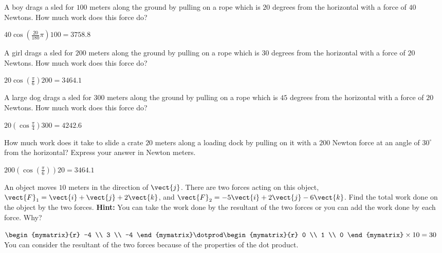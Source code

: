 \begin{enumialphparenastyle}

\begin{ex} A boy drags a sled for $100$ meters along the ground by pulling on a rope
which is $20$ degrees from the horizontal with a force of $40$ Newtons. How much
work does this force do?
\begin{sol}
$40\cos \left( \frac{20}{180}\pi \right)100=3758.8  $
\end{sol}
\end{ex}

\begin{ex} A girl drags a sled for $200$ meters along the ground by pulling on a rope
which is $30$ degrees from the horizontal with a force of $20$ Newtons. How much
work does this force do?
\begin{sol}
$20\cos \left( \frac{\pi }{6}\right)200= 3464.1 $
\end{sol}
\end{ex}

\begin{ex} A large dog drags a sled for $300$ meters along the ground by pulling on a
rope which is $45$ degrees from the horizontal with a force of $20$ Newtons. How
much work does this force do?
\begin{sol}
 $20\left( \cos \frac{\pi }{4}\right)300=4242.6 $
\end{sol}
\end{ex}

\begin{ex} How much work does it take to slide a crate $20$ meters
along a loading dock by pulling on it with a $200$ Newton force at an angle of
$30^{\circ }$ from the horizontal? Express your answer in Newton meters. 
\begin{sol}
$200\left( \cos \left( \frac{\pi }{6}\right) \right) 20= 3464.1$
\end{sol}
\end{ex}

\begin{ex} An object moves $10$ meters in the direction of $\vect{j}$. There are
two forces acting on this object, $\vect{F}_{1}=\vect{i}+\vect{j}+
2\vect{k}$, and $\vect{F}_{2}=-5\vect{i}+2\vect{j}-6\vect{k}$. Find
the total work done on the object by the two forces. \textbf{Hint: }You can
take the work done by the resultant of the two forces or you can add the
work done by each force. Why?
\begin{sol}
 $\begin{mymatrix}{r}
 -4 \\
3 \\
-4
\end{mymatrix} \dotprod \begin{mymatrix}{r}
0 \\
1 \\
0
\end{mymatrix} \times 10= 30$ You can consider the resultant of the
two forces because of the properties of the dot product.
\end{sol}
\end{ex}


\end{enumialphparenastyle}
